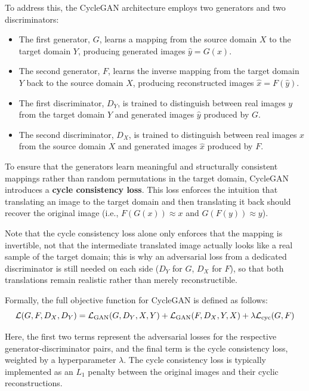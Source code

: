 To address this, the CycleGAN architecture employs two generators and two discriminators:
\begin{itemize}
    \item The first generator, $G$, learns a mapping from the source domain $X$ to the target domain $Y$, producing generated images $\hat{y} = G(x)$.
    \item The second generator, $F$, learns the inverse mapping from the target domain $Y$ back to the source domain $X$, producing reconstructed images $\hat{x} = F(\hat{y})$.
    \item The first discriminator, $D_Y$, is trained to distinguish between real images $y$ from the target domain $Y$ and generated images $\hat{y}$ produced by $G$.
    \item The second discriminator, $D_X$, is trained to distinguish between real images $x$ from the source domain $X$ and generated images $\hat{x}$ produced by $F$.
\end{itemize}

To ensure that the generators learn meaningful and structurally consistent mappings rather than random permutations in the target domain, CycleGAN introduces a \textbf{cycle consistency loss}. This loss enforces the intuition that translating an image to the target domain and then translating it back should recover the original image (i.e., $F(G(x)) \approx x$ and $G(F(y)) \approx y$).

Note that the cycle consistency loss alone only enforces that the mapping is invertible, not that the intermediate translated image actually looks like a real sample of the target domain; this is why an adversarial loss from a dedicated discriminator is still needed on each side ($D_Y$ for $G$, $D_X$ for $F$), so that both translations remain realistic rather than merely reconstructible.

Formally, the full objective function for CycleGAN is defined as follows:
\begin{equation}
\mathcal{L}(G, F, D_X, D_Y) = \mathcal{L}_{\text{GAN}}(G, D_Y, X, Y) + \mathcal{L}_{\text{GAN}}(F, D_X, Y, X) + \lambda \mathcal{L}_{\text{cyc}}(G, F)
\end{equation}

Here, the first two terms represent the adversarial losses for the respective generator-discriminator pairs, and the final term is the cycle consistency loss, weighted by a hyperparameter $\lambda$. 
The cycle consistency loss is typically implemented as an $L_1$ penalty between the original images and their cyclic reconstructions.


